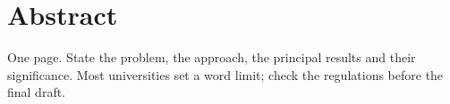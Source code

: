 \chapter*{Abstract}

One page. State the problem, the approach, the principal results and their
significance. Most universities set a word limit; check the regulations
before the final draft.
